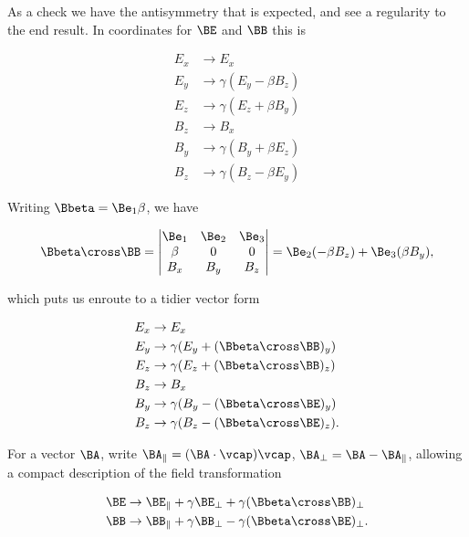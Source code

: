 As a check we have the antisymmetry that is expected, and see a regularity to the end result.  In coordinates for $\BE$ and $\BB$ this is

\begin{align}\label{eqn:relElectroDynProblemSet3:1320}
E_x &\rightarrow E_x \\
E_y &\rightarrow \gamma ( E_y - \beta B_z ) \\
E_z &\rightarrow \gamma ( E_z + \beta B_y ) \\
B_z &\rightarrow B_x \\
B_y &\rightarrow \gamma ( B_y + \beta E_z ) \\
B_z &\rightarrow \gamma ( B_z - \beta E_y ) 
\end{align}

Writing $\Bbeta = \Be_1 \beta$, we have

\begin{equation}\label{eqn:relElectroDynProblemSet3:1340}
\Bbeta \cross \BB = 
\begin{vmatrix} 
\Be_1 & \Be_2 & \Be_3 \\
\beta & 0 & 0 \\
B_x & B_y & B_z
\end{vmatrix} 
= \Be_2 (-\beta B_z) + \Be_3( \beta B_y ),
\end{equation}

which puts us enroute to a tidier vector form

\begin{align}\label{eqn:relElectroDynProblemSet3:1360}
E_x &\rightarrow E_x \\
E_y &\rightarrow \gamma ( E_y + (\Bbeta \cross \BB)_y ) \\
E_z &\rightarrow \gamma ( E_z + (\Bbeta \cross \BB)_z ) \\
B_z &\rightarrow B_x \\
B_y &\rightarrow \gamma ( B_y - (\Bbeta \cross \BE)_y ) \\
B_z &\rightarrow \gamma ( B_z - (\Bbeta \cross \BE)_z ).
\end{align}

For a vector $\BA$, write $\BA_\parallel = (\BA \cdot \vcap)\vcap$, $\BA_\perp = \BA - \BA_\parallel$, allowing a compact description of the field transformation

\begin{align}\label{eqn:relElectroDynProblemSet3:1380}
\BE &\rightarrow \BE_\parallel + \gamma \BE_\perp + \gamma (\Bbeta \cross \BB)_\perp \\
\BB &\rightarrow \BB_\parallel + \gamma \BB_\perp - \gamma (\Bbeta \cross \BE)_\perp.
\end{align}


